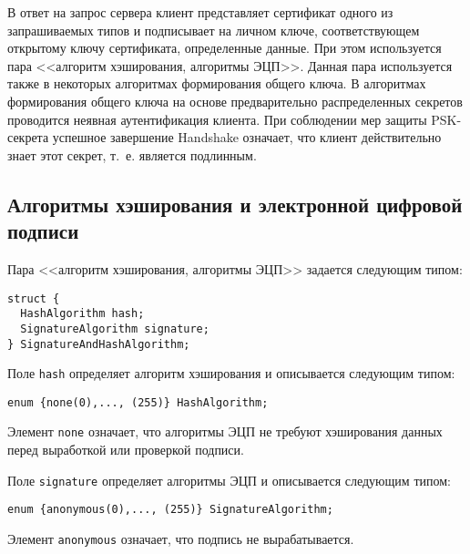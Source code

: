 В ответ на запрос сервера клиент представляет сертификат одного из 
запрашиваемых типов и подписывает на личном ключе, соответствующем 
открытому ключу сертификата, определенные данные. При этом используется 
пара <<алгоритм хэширования, алгоритмы ЭЦП>>. Данная пара используется 
также в некоторых алгоритмах формирования общего ключа. 
В алгоритмах формирования общего ключа на основе предварительно 
распределенных секретов проводится неявная аутентификация клиента. При 
соблюдении мер защиты PSK-секрета успешное завершение 
Handshake означает, что клиент действительно знает этот 
секрет, т.~е. является подлинным.  

\subsection{Алгоритмы хэширования и электронной цифровой 
подписи}\label{CRYPTO.3.3}

Пара <<алгоритм хэширования, алгоритмы ЭЦП>> задается следующим типом:
\begin{lstlisting}
struct {
  HashAlgorithm hash;
  SignatureAlgorithm signature;
} SignatureAndHashAlgorithm;
\end{lstlisting}

Поле \lstinline{hash} определяет алгоритм хэширования и описывается 
следующим типом:  
\begin{lstlisting}
enum {none(0),..., (255)} HashAlgorithm;
\end{lstlisting}

Элемент \lstinline{none} означает, что алгоритмы ЭЦП не требуют 
хэширования данных перед выработкой или проверкой подписи.  

Поле \lstinline{signature} определяет алгоритмы ЭЦП и описывается 
следующим типом: 
\begin{lstlisting}
enum {anonymous(0),..., (255)} SignatureAlgorithm;
\end{lstlisting}

Элемент \lstinline{anonymous} означает, что подпись не вырабатывается.


